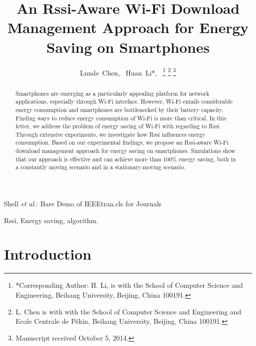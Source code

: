 \documentclass[journal]{IEEEtran}
\begin{document}
%
\title{An Rssi-Aware Wi-Fi Download Management Approach for Energy Saving on Smartphones}
%
\author{Lunde~Chen,
        ~Huan~Li*,~%
\thanks{*Corresponding Author: H. Li,  is with the School
of Computer Science and Engineering, Beihang University, Beijing,
China 100191.
}%
\thanks{L. Chen is with with the School of Computer Science and Engineering and Ecole Centrale de P\'{e}kin, Beihang University, Beijing, China 100191.}
\thanks{Manuscript received October 5, 2014.}}

{Shell \MakeLowercase{\textit{et al.}}: Bare Demo of IEEEtran.cls for Journals}

\maketitle

\begin{abstract}
Smartphones are emerging as a particularly appealing platform for network applications, 
especially through Wi-Fi interface. However,
Wi-Fi entails considerable energy consumption and smartphones
are bottlenecked by their battery capacity. Finding ways to reduce 
energy consumption of Wi-Fi is more than critical.
In this letter, we address the problem of energy saving of Wi-Fi 
with regarding to Rssi. Through extensive experiments, we investigate how 
Rssi influences energy consumption. Based on our experimental findings, 
we propose an Rssi-aware Wi-Fi download management approach for energy saving on smartphones.
Simulations show that our approach is effective and can achieve more than 100\% energy saving, 
both in a constantly moving scenario and in a stationary-moving scenario.
\end{abstract}

\begin{IEEEkeywords}
Rssi, Energy saving, algorithm.
\end{IEEEkeywords}

\IEEEpeerreviewmaketitle

\section{Introduction}
\end{document}
